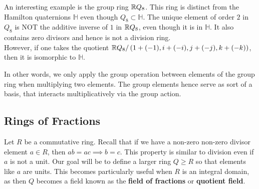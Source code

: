 \documentclass{memoir}
\begin{document}
\begin{exmp}[\(\R Q_8\)]
	An interesting example is the group ring \(\R Q_8\). This ring is distinct from the Hamilton quaternions \(\mathbb{H}\) even though \(Q_8 \subset \mathbb{H}\). The unique element of order \(2\) in \(Q_8\) is NOT the additive inverse of \(1 \) in \(\R Q_8\), even though it is in \(\mathbb{H}\). It also contains zero divisors and hence is not a division ring.\\

	However, if one takes the quotient \(\mathbb{R} Q_8 / \left( 1 + (-1), i + (-i), j + (-j), k + (-k) \right) \), then it is isomorphic to \(\mathbb{H}\).
\end{exmp}
In other words, we only apply the group operation between elements of the group ring when multiplying two elements. The group elements hence serve as sort of a basis, that interacts multiplicatively via the group action.

\subsection{Rings of Fractions}
\label{sub:rings_of_fractions}

Let \(R\) be a commutative ring. Recall that if we have a non-zero non-zero divisor element \(a \in R\), then \(ab = ac \implies b = c\). This property is similar to division even if \(a\) is not a unit. Our goal will be to define a larger ring \(Q\geq R\) so that elements like \(a\) are units. This becomes particularly useful when \(R\) is an integral domain, as then \(Q\) becomes a field known as the \textbf{field of fractions} or \textbf{quotient field}.
\end{document}
